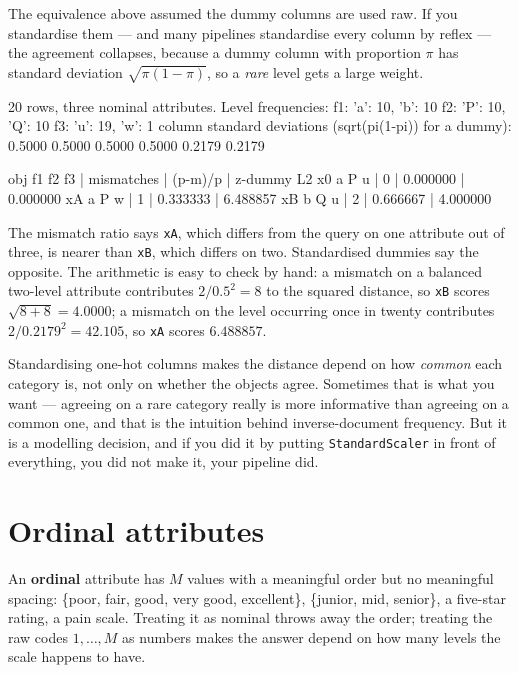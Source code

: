 \documentclass[11pt]{article}
\begin{document}
The equivalence above assumed the dummy columns are used raw. If you
standardise them --- and many pipelines standardise every column by reflex
--- the agreement collapses, because a dummy column with proportion $\pi$ has
standard deviation $\sqrt{\pi(1-\pi)}$, so a \emph{rare} level gets a large
weight.

\begin{codeout}
20 rows, three nominal attributes.  Level frequencies:
  f1: {'a': 10, 'b': 10}
  f2: {'P': 10, 'Q': 10}
  f3: {'u': 19, 'w': 1}
column standard deviations (sqrt(pi(1-pi)) for a dummy):
  0.5000  0.5000  0.5000  0.5000  0.2179  0.2179

obj  f1   f2   f3   | mismatches |      (p-m)/p |     z-dummy L2
x0   a    P    u    |          0 |     0.000000 |       0.000000
xA   a    P    w    |          1 |     0.333333 |       6.488857
xB   b    Q    u    |          2 |     0.666667 |       4.000000
\end{codeout}

The mismatch ratio says \texttt{xA}, which differs from the query on one
attribute out of three, is nearer than \texttt{xB}, which differs on two.
Standardised dummies say the opposite. The arithmetic is easy to check by
hand: a mismatch on a balanced two-level attribute contributes
$2/0.5^2 = 8$ to the squared distance, so \texttt{xB} scores
$\sqrt{8+8} = 4.0000$; a mismatch on the level occurring once in twenty
contributes $2/0.2179^2 = 42.105$, so \texttt{xA} scores $6.488857$.

\begin{keyidea}
Standardising one-hot columns makes the distance depend on how \emph{common}
each category is, not only on whether the objects agree. Sometimes that is
what you want --- agreeing on a rare category really is more informative than
agreeing on a common one, and that is the intuition behind inverse-document
frequency. But it is a modelling decision, and if you did it by putting
\texttt{StandardScaler} in front of everything, you did not make it, your
pipeline did.
\end{keyidea}

\section{Ordinal attributes}
\label{sec:ordinal}

An \textbf{ordinal} attribute has $M$ values with a meaningful order but no
meaningful spacing: \{poor, fair, good, very good, excellent\},
\{junior, mid, senior\}, a five-star rating, a pain scale. Treating it as
nominal throws away the order; treating the raw codes $1,\dots,M$ as numbers
makes the answer depend on how many levels the scale happens to have.
\end{document}
